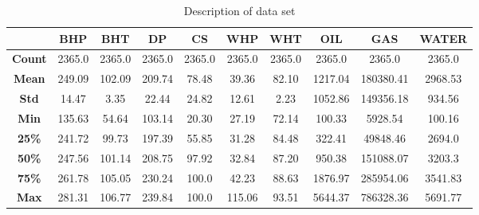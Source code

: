 \documentclass[english]{article}
\begin{document}
\begin{appendices}
\begin{table}[H]
\centering
\caption{Description of data set}
\begin{tabular}{|c|c|c|c|c|c|c|c|c|c|}
\hline
\textbf{}      & \textbf{BHP} & \textbf{BHT} & \textbf{DP} & \textbf{CS} & \textbf{WHP} & \textbf{WHT} & \textbf{OIL} & \textbf{GAS} & \textbf{WATER} \\ \hline
\textbf{Count} & 2365.0       & 2365.0       & 2365.0      & 2365.0      & 2365.0       & 2365.0       & 2365.0       & 2365.0       & 2365.0         \\ \hline
\textbf{Mean}  & 249.09       & 102.09       & 209.74      & 78.48       & 39.36        & 82.10        & 1217.04      & 180380.41    & 2968.53        \\ \hline
\textbf{Std}   & 14.47        & 3.35         & 22.44       & 24.82       & 12.61        & 2.23         & 1052.86      & 149356.18    & 934.56         \\ \hline
\textbf{Min}   & 135.63       & 54.64        & 103.14      & 20.30       & 27.19        & 72.14        & 100.33       & 5928.54      & 100.16         \\ \hline
\textbf{25\%}  & 241.72       & 99.73        & 197.39      & 55.85       & 31.28        & 84.48        & 322.41       & 49848.46     & 2694.0         \\ \hline
\textbf{50\%}  & 247.56       & 101.14       & 208.75      & 97.92       & 32.84        & 87.20        & 950.38       & 151088.07    & 3203.3         \\ \hline
\textbf{75\%}  & 261.78       & 105.05       & 230.24      & 100.0       & 42.23        & 88.63        & 1876.97      & 285954.06    & 3541.83        \\ \hline
\textbf{Max}   & 281.31       & 106.77       & 239.84      & 100.0       & 115.06       & 93.51        & 5644.37      & 786328.36    & 5691.77        \\ \hline
\end{tabular}
\end{table}


\end{appendices}
\end{document}
